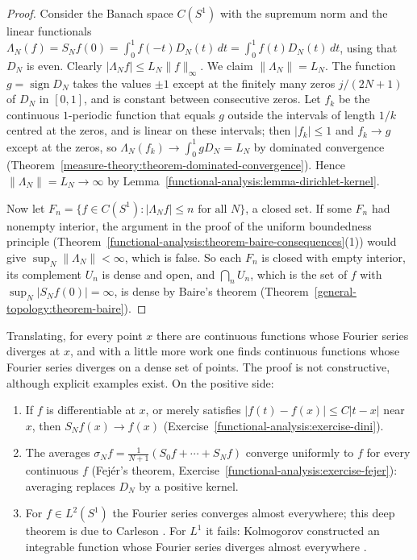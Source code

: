 \begin{proof}
Consider the Banach space $C(S^1)$ with the supremum norm and the linear functionals $\Lambda_N(f) = S_Nf(0) = \int_0^1f(-t)D_N(t)\,dt = \int_0^1f(t)D_N(t)\,dt$, using that $D_N$ is even. Clearly
$|\Lambda_Nf| \leq L_N\|f\|_\infty$. We claim $\|\Lambda_N\| = L_N$. The function $g = \operatorname{sign}D_N$ takes the values $\pm1$ except at the finitely many zeros $j/(2N + 1)$ of $D_N$ in $[0, 1]$, and is
constant between consecutive zeros. Let $f_k$ be the continuous $1$-periodic function that equals $g$ outside the intervals of length $1/k$ centred at the zeros, and is linear on these intervals; then
$|f_k| \leq 1$ and $f_k \to g$ except at the zeros, so $\Lambda_N(f_k) \to \int_0^1gD_N = L_N$ by dominated convergence (Theorem~\ref{measure-theory:theorem-dominated-convergence}). Hence
$\|\Lambda_N\| = L_N \to \infty$ by Lemma~\ref{functional-analysis:lemma-dirichlet-kernel}.

Now let $F_n = \{f \in C(S^1) : |\Lambda_Nf| \leq n \text{ for all } N\}$, a closed set. If some $F_n$ had nonempty interior, the argument in the proof of the uniform boundedness principle
(Theorem~\ref{functional-analysis:theorem-baire-consequences}(1)) would give $\sup_N\|\Lambda_N\| < \infty$, which is false. So each $F_n$ is closed with empty interior, its complement $U_n$ is dense and open,
and $\bigcap_nU_n$, which is the set of $f$ with $\sup_N|S_Nf(0)| = \infty$, is dense by Baire's theorem (Theorem~\ref{general-topology:theorem-baire}).
\end{proof}

Translating, for every point $x$ there are continuous functions whose Fourier series diverges at $x$, and with a little more work one finds continuous functions whose Fourier series diverges on a
dense set of points. The proof is not constructive, although explicit examples exist. On the positive side:
\begin{enumerate}
\item If $f$ is differentiable at $x$, or merely satisfies $|f(t) - f(x)| \leq C|t - x|$ near $x$, then $S_Nf(x) \to f(x)$ (Exercise~\ref{functional-analysis:exercise-dini}).
\item The averages $\sigma_Nf = \frac{1}{N + 1}(S_0f + \cdots + S_Nf)$ converge uniformly to $f$ for every continuous $f$ (Fej\'er's theorem, Exercise~\ref{functional-analysis:exercise-fejer}): averaging
replaces $D_N$ by a positive kernel.
\item For $f \in L^2(S^1)$ the Fourier series converges almost everywhere; this deep theorem is due to Carleson \cite{carleson-1966}. For $L^1$ it fails: Kolmogorov constructed an integrable function
whose Fourier series diverges almost everywhere \cite{kolmogorov-1923}.
\end{enumerate}

